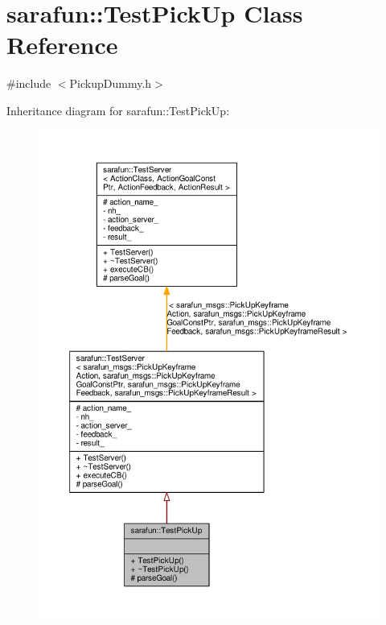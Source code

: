 \hypertarget{classsarafun_1_1TestPickUp}{\section{sarafun\-:\-:Test\-Pick\-Up Class Reference}
\label{classsarafun_1_1TestPickUp}
}


{\ttfamily \#include $<$Pickup\-Dummy.\-h$>$}



Inheritance diagram for sarafun\-:\-:Test\-Pick\-Up\-:\nopagebreak
\begin{figure}[H]
\begin{center}
\leavevmode
\includegraphics[width=350pt]{d0/da2/classsarafun_1_1TestPickUp__inherit__graph}
\end{center}
\end{figure}


